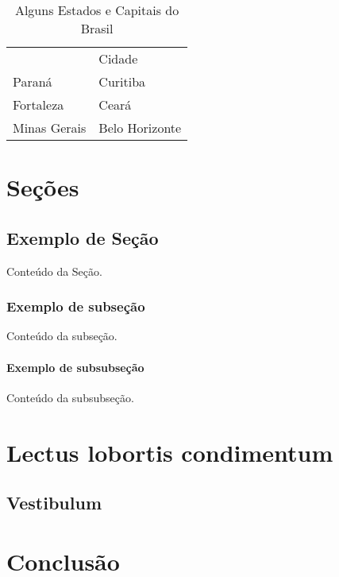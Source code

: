 \begin{table}[!htb]
	\centering
	\caption{Alguns Estados e Capitais do Brasil}
	\begin{tabular}{ll}
	\rowcolor[HTML]{CBCEFB}
	\multicolumn{1}{c}{\cellcolor[HTML]{CBCEFB}Estado} & Cidade         \\
	Paraná                                             & Curitiba       \\
	Fortaleza                                          & Ceará          \\
	Minas Gerais                                       & Belo Horizonte
	\end{tabular}
\end{table}

\chapter{Seções}

\section{Exemplo de Seção}

Conteúdo da Seção.

\subsection{Exemplo de subseção}

Conteúdo da subseção.

\subsubsection{Exemplo de subsubseção}

Conteúdo da subsubseção.

\chapter{Lectus lobortis condimentum}

\section{Vestibulum}

\lipsum[21-22]

\chapter{Conclusão}

